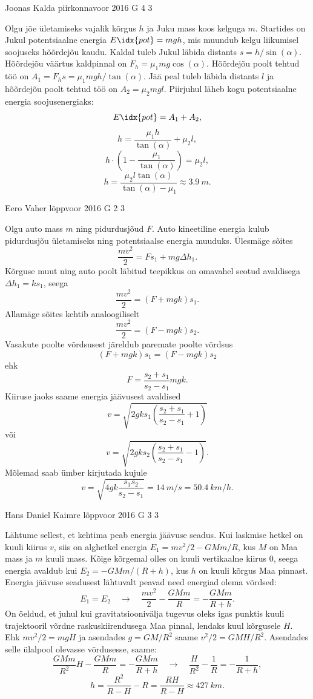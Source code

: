 \documentclass[11pt]{article}
\begin{document}
{%
{Joonas Kalda} %
{piirkonnavoor} %
{2016} %
{G 4} %
{3} %
{

\ifSolution
Olgu jõe ületamiseks vajalik kõrgus $h$ ja Juku mass koos kelguga $m$. Startides on Jukul potentsiaalne energia $E\idx{pot} = mgh$, mis muundub kelgu liikumisel soojuseks hõõrdejõu kaudu. Kaldal tuleb Jukul läbida distants $s = h/\sin(\alpha)$. Hõõrdejõu väärtus kaldpinnal on $F_h=\mu_1 mg \cos(\alpha)$. Hõõrdejõu poolt tehtud töö on $A_1 = F_h s = {\mu_1}mgh/\tan(\alpha)$. Jää peal tuleb läbida distants $l$ ja hõõrdejõu poolt tehtud töö on $A_2 = {\mu_2}mgl$. Piirjuhul läheb kogu potentsiaalne energia soojusenergiaks:
$$E\idx{pot} = A_1 + A_2,$$
$$h =\frac{\mu_1 h}{\tan(\alpha)} + {\mu_2} l, $$
$$h \cdot \left(1 - \frac{\mu_1}{\tan(\alpha)}\right) = {\mu_2} l,$$
$$h = \frac{\mu_2 l \tan(\alpha)}{\tan(\alpha) - {\mu_1}} \approx \SI{3.9}{m}.$$
\fi
}

{Eero Vaher} %
{lõppvoor} %
{2016} %
{G 2} %
{3} %
{

\ifSolution
Olgu auto mass $m$ ning pidurdusjõud $F$. Auto kineetiline energia kulub pidurdusjõu ületamiseks ning potentsiaalse energia muuduks. Ülesmäge sõites
\[
\frac{mv^2}{2}=Fs_1+mg\Delta h_1.
\]
Kõrguse muut ning auto poolt läbitud teepikkus on omavahel seotud avaldisega $\Delta h_1=ks_1$, seega
\[
\frac{mv^2}{2}=\left(F+mgk\right)s_1.
\]
Allamäge sõites kehtib analoogiliselt
\[
\frac{mv^2}{2}=\left(F-mgk\right)s_2.
\]
Vasakute poolte võrdsusest järeldub paremate poolte võrdsus 
\[
\left(F+mgk\right)s_1=\left(F-mgk\right)s_2
\]
ehk
\[
F=\frac{s_2+s_1}{s_2-s_1}mgk.
\]
Kiiruse jaoks saame energia jäävusest avaldised 
\[
v=\sqrt{2gks_1\left(\frac{s_2+s_1}{s_2-s_1}+1\right)}
\]
või
\[
v=\sqrt{2gks_2\left(\frac{s_2+s_1}{s_2-s_1}-1\right)}.
\]
Mõlemad saab ümber kirjutada kujule 
\[
v=\sqrt{4gk\frac{s_1s_2}{s_2-s_1}}=\SI{14}{m \per s}=\SI{50.4}{km \per h}.
\]
\fi
}

{Hans Daniel Kaimre} %
{lõppvoor} %
{2016} %
{G 3} %
{3} %
{

\ifSolution
Lähtume sellest, et kehtima peab energia jäävuse seadus. Kui laskmise hetkel on kuuli kiirus $v$, siis on alghetkel energia $E_1 = mv^2/2 - GMm/R$, kus $M$ on Maa mass ja $m$ kuuli mass. Kõige kõrgemal olles on kuuli vertikaalne kiirus \num{0}, seega energia avaldub kui $E_2 = -GMm/(R+h)$, kus $h$ on kuuli kõrgus Maa pinnast. Energia jäävuse seadusest lähtuvalt peavad need energiad olema võrdsed:$$E_1 = E_2 \quad\rightarrow\quad \frac{mv^2}{2} - \frac{GMm}{R} = -\frac{GMm}{R+h}.$$
On öeldud, et juhul kui gravitatsioonivälja tugevus oleks igas punktis kuuli trajektooril võrdne raskuskiirendusega Maa pinnal, lendaks kuul kõrgusele $H$. Ehk $mv^2/2=mgH$ ja asendades $g=GM/R^2$ saame $v^2/2=GMH/R^2$. Asendades selle ülalpool olevasse võrdusesse, saame:
$$\frac{GMm}{R^2}H - \frac{GMm}{R} = -\frac{GMm}{R+h} \quad\rightarrow\quad \frac{H}{R^2}-\frac{1}{R} = - \frac{1}{R+h},$$
$$h=\frac{R^2}{R-H} - R = \frac{RH}{R-H} \approx \SI{427}{km}.$$
\fi
}

}
\end{document}
